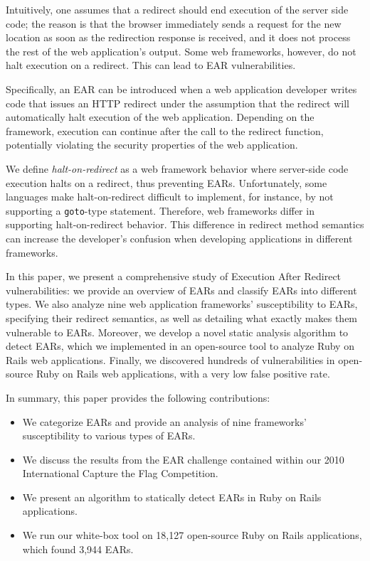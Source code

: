 Intuitively, one assumes that a redirect should end execution of the
server side code; the reason is that the browser immediately sends a
request for the new location as soon as the redirection response is
received, and it does not process the rest of the web application's output. Some
web frameworks, however, do not halt execution on a redirect. This can
lead to EAR vulnerabilities.
 
Specifically, an EAR can be introduced when a web application developer
writes code that issues an HTTP redirect under the assumption that the
redirect will automatically halt execution of the web application.
Depending on the framework, execution can continue after the call to the
redirect function, potentially violating the security properties of the web
application.

We define \emph{halt-on-redirect} as a web framework behavior where
server-side code execution halts on a redirect, thus preventing EARs.
Unfortunately, some languages make halt-on-redirect difficult to implement,
for instance, by not supporting a \texttt{goto}-type statement. Therefore,
web frameworks differ in supporting halt-on-redirect behavior. This
difference in redirect method semantics can increase the developer's
confusion when developing applications in different frameworks.

In this paper, we present a comprehensive study of Execution After Redirect
vulnerabilities: we provide an overview of EARs and classify EARs into
different types. We also analyze nine web application frameworks'
susceptibility to EARs, specifying their redirect semantics, as well as
detailing what exactly makes them vulnerable to EARs. Moreover, we develop a
novel static analysis algorithm to detect EARs, which we implemented in an
open-source tool to analyze Ruby on Rails web applications. Finally, we
discovered hundreds of vulnerabilities in open-source Ruby on Rails web
applications, with a very low false positive rate.

In summary, this paper provides the following contributions:

\begin{itemize}

\item We categorize EARs and provide an analysis of nine frameworks'
  susceptibility to various types of EARs.

\item We discuss the results from the EAR challenge contained within our 2010
  International Capture the Flag Competition.

\item We present an algorithm to statically detect EARs in Ruby on
  Rails applications.

\item We run our white-box tool on 18,127 open-source Ruby on
  Rails applications, which found 3,944 EARs.

\end{itemize}

